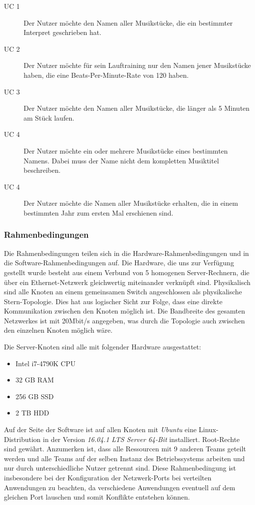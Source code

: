 \begin{description}
	\item[UC 1] Der Nutzer möchte den Namen aller Musikstücke, die ein bestimmter Interpret geschrieben hat.
	\item[UC 2] Der Nutzer möchte für sein Lauftraining nur den Namen jener Musikstücke haben, die eine Beats-Per-Minute-Rate
		von 120 haben.
	\item[UC 3] Der Nutzer möchte den Namen aller Musikstücke, die länger als 5 Minuten am Stück laufen.
	\item[UC 4] Der Nutzer möchte ein oder mehrere Musikstücke eines bestimmten Namens. Dabei muss der Name nicht dem 
		kompletten Musiktitel beschreiben.
	\item[UC 4] Der Nutzer möchte die Namen aller Musikstücke erhalten, die in einem bestimmten Jahr zum ersten Mal erschienen sind.
\end{description}

\subsubsection{Rahmenbedingungen}
Die Rahmenbedingungen teilen sich in die Hardware-Rahmenbedingungen und in die Software-Rahmenbedingungen auf.
Die Hardware, die uns zur Verfügung gestellt wurde besteht aus einem Verbund von 5 homogenen Server-Rechnern, 
die über ein Ethernet-Netzwerk gleichwertig miteinander verknüpft sind. Physikalisch sind alle Knoten an einem gemeinsamen
Switch angeschlossen als physikalische Stern-Topologie. Dies hat aus logischer Sicht zur Folge, dass eine direkte Kommunikation
zwischen den Knoten möglich ist. Die Bandbreite des gesamten Netzwerkes ist mit 20Mbit/s angegeben, was durch die Topologie
auch zwischen den einzelnen Knoten möglich wäre.

Die Server-Knoten sind alle mit folgender Hardware ausgestattet:
\begin{itemize}
	\item Intel i7-4790K CPU
	\item 32 GB RAM
	\item 256 GB SSD
	\item 2 TB HDD
\end{itemize}

Auf der Seite der Software ist auf allen Knoten mit \textit{Ubuntu} eine Linux-Distribution in der Version 
\textit{16.04.1 LTS Server 64-Bit} installiert. Root-Rechte sind gewährt.
Anzumerken ist, dass alle Ressourcen mit 9 anderen Teams geteilt werden und alle Teams auf der selben 
Instanz des Betriebssystems arbeiten und nur durch unterschiedliche Nutzer getrennt sind. 
Diese Rahmenbedingung ist insbesondere bei der Konfiguration der Netzwerk-Ports bei verteilten Anwendungen 
zu beachten, da verschiedene Anwendungen eventuell auf dem gleichen Port lauschen und somit 
Konflikte entstehen können.

